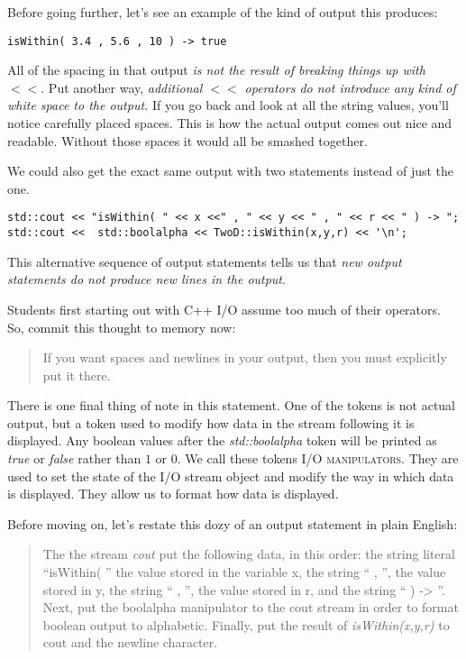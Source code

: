 \documentclass[]{tufte-handout}
\begin{document}
Before going further, let's see an example of the kind of output this produces:
\begin{verbatim}
isWithin( 3.4 , 5.6 , 10 ) -> true
\end{verbatim}
All of the spacing in that output \textit{is not the result of breaking things up with $<<$}. Put another way, \textit{additional $<<$ operators do not introduce any kind of white space to the output.}  If you go back and look at all the string values, you'll notice carefully placed spaces. This is how the actual output comes out nice and readable. Without those spaces it would all be smashed together.

We could also get the exact same output with two statements instead of just the one.
\begin{verbatim}
std::cout << "isWithin( " << x <<" , " << y << " , " << r << " ) -> ";
std::cout <<  std::boolalpha << TwoD::isWithin(x,y,r) << '\n';
\end{verbatim}
This alternative sequence of output statements tells us that \textit{new output statements do not produce new lines in the output}.

Students first starting out with C++ I/O assume too much of their operators. So, commit this thought to memory now:
\begin{quote}
If you want spaces and newlines in your output, then you must explicitly put it there.
\end{quote}


There is one final thing of note in this statement. One of the tokens is not actual output, but a token used to modify how data in the stream following it is displayed. Any boolean values after the \textit{std::boolalpha} token will be printed as \textit{true} or \textit{false} rather than $1$ or $0$.  We call these tokens \textsc{I/O manipulators}. They are used to set the state of the I/O stream object and modify the way in which data is displayed.  They allow us to format how data is displayed.

Before moving on, let's restate this dozy of an output statement in plain English:
\begin{quote}
The the stream \textit{cout} put the following data, in this order: the string literal ``isWithin( '' the value stored in the variable x, the string `` , '', the value stored in y, the string `` , '', the value stored in r, and the string `` ) -> ''. Next, put the boolalpha manipulator to the cout stream in order to format boolean output to alphabetic. Finally, put the result of \textit{isWithin(x,y,r)} to cout and the newline character.
\end{quote}
\end{document}
